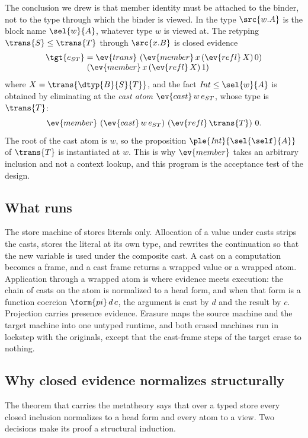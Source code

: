 The conclusion we drew is that member identity must be attached to the binder, not to the type through which the binder is viewed. In \FCdot the type $\src{w.A}$ is the block name $\sel{w}{A}$, whatever type $w$ is viewed at. The retyping $\trans{S} \le \trans{T}$ through $\src{x.B}$ is closed evidence
\[
\begin{array}{@{}l@{}}
\tgt{e_{ST}} = \ev{trans}\ (\ev{member}\,x\,(\ev{refl}\,X)\,0) \\
\qquad\qquad\quad (\ev{member}\,x\,(\ev{refl}\,X)\,1)
\end{array}
\]
where $X = \trans{\dtyp{B}{S}{T}}$, and the fact $\mathit{Int} \le \sel{w}{A}$ is obtained by eliminating at the \emph{cast atom} $\ev{cast}\,w\,e_{ST}$, whose type is $\trans{T}$:
\[
\ev{member}\ (\ev{cast}\,w\,e_{ST})\ (\ev{refl}\,\trans{T})\ 0 .
\]
The root of the cast atom is $w$, so the proposition $\ple{\mathit{Int}}{\sel{\self}{A}}$ of $\trans{T}$ is instantiated at $w$. This is why $\ev{member}$ takes an arbitrary inclusion and not a context lookup, and this program is the acceptance test of the design.

\subsection{What runs}

The store machine of \FCdot stores literals only. Allocation of a value under casts strips the casts, stores the literal at its own type, and rewrites the continuation so that the new variable is used under the composite cast. A cast on a computation becomes a frame, and a cast frame returns a wrapped value or a wrapped atom. Application through a wrapped atom is where evidence meets execution: the chain of casts on the atom is normalized to a head form, and when that form is a function coercion $\form{pi}\,d\,c$, the argument is cast by $d$ and the result by $c$. Projection carries presence evidence. Erasure maps the source machine and the target machine into one untyped runtime, and both erased machines run in lockstep with the originals, except that the cast-frame steps of the target erase to nothing.

\subsection{Why closed evidence normalizes structurally}\label{sec:why-structural}

The theorem that carries the metatheory says that over a typed store every closed inclusion normalizes to a head form and every atom to a view. Two decisions make its proof a structural induction.

